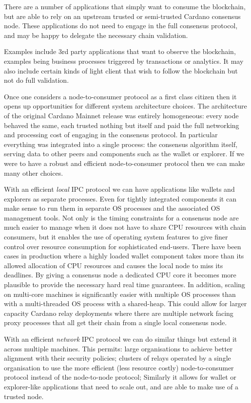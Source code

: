 \documentclass{report}
\theoremstyle{definition}{
  \newtheorem{lemma}{Lemma}[section] %
  \newtheorem{definition}[lemma]{Definition}
}
\theoremstyle{theorem}{
  \newtheorem{invariant}[lemma]{Invariant}
  \newtheorem{proofobligation}[lemma]{Proof Obligation}
}
\numberwithin{equation}{lemma}
\begin{document}
There are a number of applications that simply want to consume the blockchain,
but are able to rely on an upstream trusted or semi-trusted Cardano consensus
node. These applications do not need to engage in the full consensus protocol,
and may be happy to delegate the necessary chain validation.

Examples include 3rd party applications that want to observe the blockchain,
examples being business processes triggered by transactions or analytics.  It
may also include certain kinds of light client that wish to follow the
blockchain but not do full validation.

Once one considers a node-to-consumer protocol as a first class citizen then it
opens up opportunities for different system architecture choices.
The architecture of the original Cardano Mainnet release was entirely homogeneous:
every node behaved the same, each trusted nothing but itself and paid the full
networking and processing cost of engaging in the consensus protocol.  In
particular everything was integrated into a single process: the consensus
algorithm itself, serving data to other peers and components such as the wallet
or explorer. If we were to have a robust and efficient node-to-consumer protocol
then we can make many other choices.

With an efficient \emph{local} IPC protocol we can have applications
like wallets and explorers as separate processes. Even for tightly
integrated components it can make sense to run them in separate OS
processes and the associated OS management tools. Not only is the
timing constraints for a consensus node are much easier to manage when
it does not have to share CPU resources with chain consumers, but it
enables the use of operating system features to give finer control
over resource consumption for sophisticated end-users.  There have
been cases in production where a highly loaded wallet component takes
more than its allowed allocation of CPU resources and causes the local
node to miss its deadlines.  By giving a consensus node a dedicated
CPU core it becomes more plausible to provide the necessary hard real
time guarantees. In addition, scaling on multi-core machines is
significantly easier with multiple OS processes than with a
multi-threaded OS process with a shared-heap. This could allow for
larger capacity Cardano relay deployments where there are multiple
network facing proxy processes that all get their chain from a single
local consensus node.

With an efficient \emph{network} IPC protocol we can do similar things
but extend it across multiple machines. This permits: large
organisations to achieve better alignment with their security
policies; clusters of relays operated by a single organisation to use
the more efficient (less resource costly) node-to-consumer protocol
instead of the node-to-node protocol; Similarly it allows for wallet
or explorer-like applications that need to scale out, and are able to
make use of a trusted node.
\end{document}
